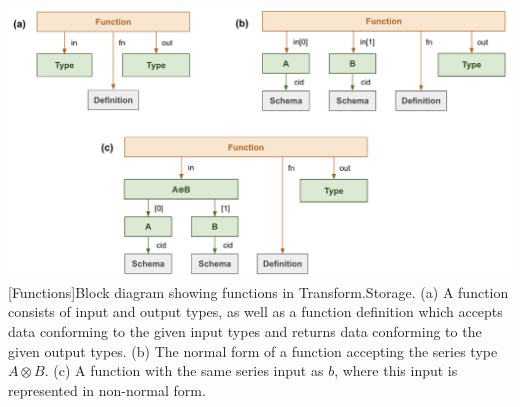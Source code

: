 \documentclass[9pt, oneside]{article}   	%
\begin{document}
\begin{center}
\includegraphics[width=1\columnwidth]{fig_functions}
[Functions]{Block diagram showing functions in Transform.Storage. (a) A function consists of input and output types, as well as a function definition which accepts data conforming to the given input types and returns data conforming to the given output types. (b) The normal form of a function accepting the series type $A \otimes B$. (c) A function with the same series input as $b$, where this input is represented in non-normal form.}
\label{functions_fig}
\end{center}
\end{document}
